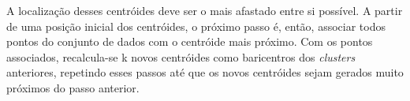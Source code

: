 A localização desses centróides deve ser o mais afastado entre si possível. A partir de uma posição inicial dos centróides, o próximo passo é, então, associar todos pontos do conjunto de dados com o centróide mais próximo. Com os pontos associados, recalcula-se k novos centróides como baricentros dos \emph{clusters} anteriores, repetindo esses passos até que os novos centróides sejam gerados muito próximos do passo anterior. 



